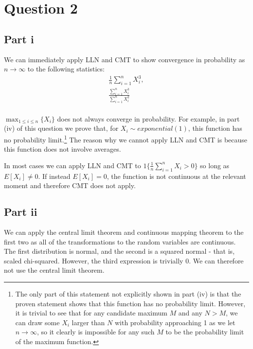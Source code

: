 \documentclass[11pt]{article} %
\begin{document}
\section{Question 2}
\subsection{Part i}
We can immediately apply LLN and CMT to show convergence in probability as $n \rightarrow \infty$ to the following statistics:
\begin{align*}
\frac{1}{n}\sum_{i=1}^n X_i^3, \\
\frac{\sum_{i=1}^n X_i^3}{\sum_{i=1}^n X_i^2}\\
\end{align*}

$\max_{1\leq i\leq n} \{X_i\}$ does not always converge in probability. For example, in part (iv) of this question we prove that, for $X_i \sim exponential(1)$, this function has no probability limit.\footnote{The only part of this statement not explicitly shown in part (iv) is that the proven statement shows that this function has no probability limit. However, it is trivial to see that for any candidate maximum $M$ and any $N>M$, we can draw some $X_i$ larger than $N$ with probability approaching 1 as we let $n\rightarrow \infty$, so it clearly is impossible for any such $M$ to be the probability limit of the maximum function.} The reason why we cannot apply LLN and CMT is because this function does not involve averages.%

In most cases we can apply LLN and CMT to $1\{ \frac{1}{n}\sum_{i=1}^n X_i >0 \}$ so long as $E[X_i]\neq 0.$ If instead $E[X_i]= 0$, the function is not continuous at the relevant moment and therefore CMT does not apply.

\subsection{Part ii}
We can apply the central limit theorem and continuous mapping theorem to the first two as all of the transformations to the random variables are continuous. The first distribution is normal, and the second is a squared normal - that is, scaled chi-squared. However, the third expression is trivially 0. We can therefore not use the central limit theorem.
\end{document}
